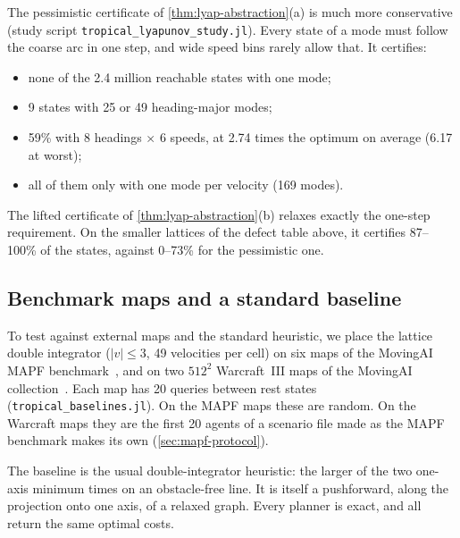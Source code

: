 \documentclass[11pt]{article}
\theoremstyle{definition}
\theoremstyle{remark}
\begin{document}
The pessimistic certificate of \cref{thm:lyap-abstraction}(a) is much more
conservative (study script \texttt{tropical\_lyapunov\_\-study.jl}). Every state of a mode must
follow the coarse arc in one step, and wide speed bins rarely allow that. It
certifies:
\begin{itemize}[nosep]
\item none of the 2.4 million reachable states with one mode;
\item 9 states with 25 or 49 heading-major modes;
\item 59\% with 8 headings $\times$ 6 speeds, at 2.74 times the optimum on
  average (6.17 at worst);
\item all of them only with one mode per velocity (169 modes).
\end{itemize}
The lifted certificate of \cref{thm:lyap-abstraction}(b) relaxes exactly the
one-step requirement. On the smaller lattices of the defect table above, it
certifies 87--100\% of the states, against 0--73\% for the pessimistic one.

\subsection{Benchmark maps and a standard baseline}\label{sec:baselines}
To test against external maps and the standard heuristic, we place the lattice
double integrator ($|v| \le 3$, 49 velocities per cell) on six maps of the MovingAI
MAPF benchmark~\cite{stern2019,sturtevant2012}, and on two $512^2$ Warcraft~III maps
of the MovingAI collection~\cite{sturtevant2012}. Each map has 20 queries between rest
states (\texttt{tropical\_baselines.jl}). On the MAPF maps these are random. On the
Warcraft maps they are the first 20 agents of a scenario file made as the MAPF
benchmark makes its own (\cref{sec:mapf-protocol}).

The baseline is the usual double-integrator heuristic: the larger of the two
one-axis minimum times on an obstacle-free line. It is itself a pushforward, along
the projection onto one axis, of a relaxed graph. Every planner is exact, and all
return the same optimal costs.
\end{document}
